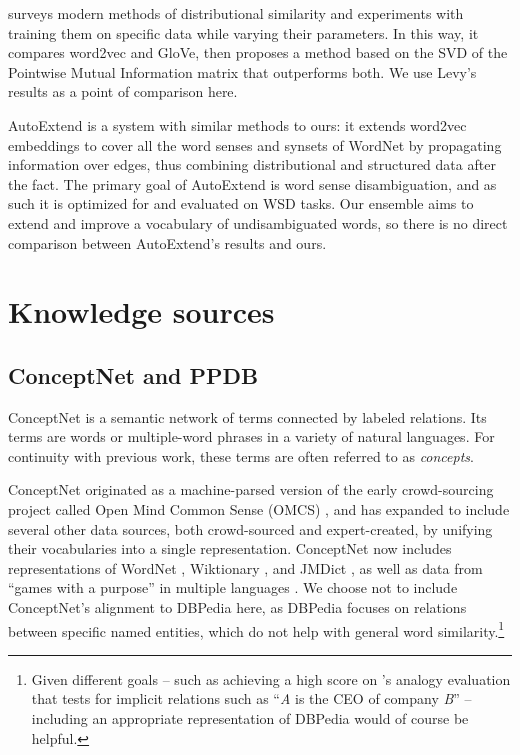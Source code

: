 \documentclass[11pt,letterpaper]{article}
\begin{document}
 surveys modern methods of distributional similarity
and experiments with training them on specific data while varying their
parameters. In this way, it compares word2vec and GloVe, then proposes a method
based on the SVD of the Pointwise Mutual Information matrix that outperforms
both. We use Levy's results as a point of comparison here.

AutoExtend \cite{rothe2015autoextend} is a system with similar methods to
ours: it extends word2vec embeddings to cover all the word senses and synsets of
WordNet by propagating information over edges, thus combining distributional and
structured data after the fact. The primary goal of AutoExtend is word sense
disambiguation, and as such it is optimized for and evaluated on WSD tasks.
Our ensemble aims to extend and improve a vocabulary of undisambiguated words,
so there is no direct comparison between AutoExtend's results and ours.

\section{Knowledge sources}

\subsection{ConceptNet and PPDB}
ConceptNet \cite{speer2012conceptnet} is a semantic network of terms
connected by labeled relations. Its terms are words or multiple-word phrases
in a variety of natural languages. For continuity with previous work,
these terms are often referred to as {\em concepts}.

ConceptNet originated as a machine-parsed version of the early crowd-sourcing
project called Open Mind Common Sense (OMCS) \cite{singh2002omcs}, and has expanded
to include several other data sources, both crowd-sourced and expert-created,
by unifying their vocabularies into a single representation. ConceptNet now includes
representations of WordNet \cite{miller1998wordnet}, Wiktionary \cite{wiktionary2014en},
and JMDict \cite{breen2004jmdict}, as well as data from ``games with a purpose'' in
multiple languages \cite{vonahn2006verbosity,kuo2009petgame,nakahara2011nadya}.
We choose not to include ConceptNet's alignment to DBPedia
\cite{auer2007dbpedia}
here, as DBPedia focuses on relations between specific named entities, which do not help
with general word similarity.\footnote{
    Given different goals -- such as achieving a high score on
    's analogy evaluation that tests for
    implicit relations such as ``{\em A} is the CEO of company {\em B}'' --
    including an appropriate representation of DBPedia would of course be helpful.
}
\end{document}
